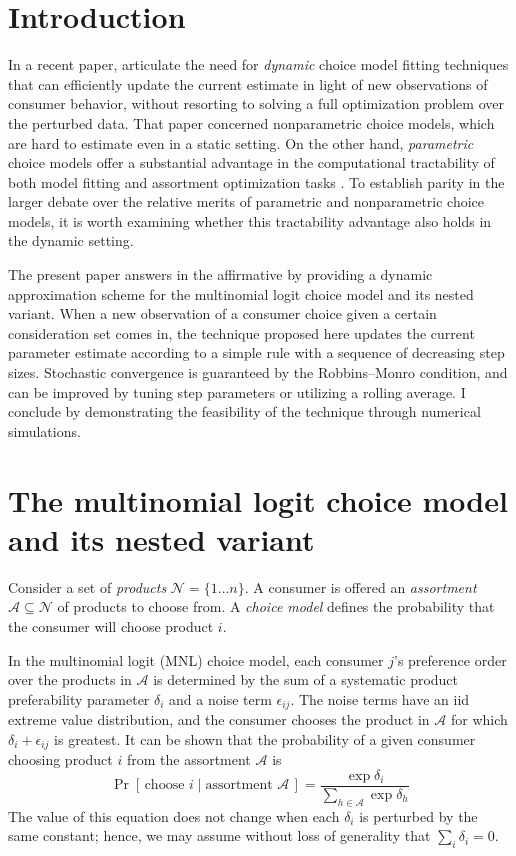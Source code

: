 \documentclass[preprint,12pt,authoryear]{elsarticle}
\begin{document}



\section{Introduction}
In a recent paper, \cite{honguyen2021} articulate the need for \emph{dynamic} choice model fitting techniques that can efficiently update the current estimate in light of new observations of consumer behavior, without resorting to solving a full optimization problem over the perturbed data. That paper concerned nonparametric choice models, which are hard to estimate even in a static setting. On the other hand, \emph{parametric} choice models offer a substantial advantage in the computational tractability of both model fitting and assortment optimization tasks \cite[][]{bunch1987, davis2014}. To establish parity in the larger debate over the relative merits of parametric and nonparametric choice models, it is worth examining whether this tractability advantage also holds in the dynamic setting. 

The present paper answers in the affirmative by providing a dynamic approximation scheme for the multinomial logit choice model and its nested variant. When a new observation of a consumer choice given a certain consideration set comes in, the technique proposed here updates the current parameter estimate according to a simple rule with a sequence of decreasing step sizes. Stochastic convergence is guaranteed by the Robbins--Monro condition, and can be improved by tuning step parameters or utilizing a rolling average. I conclude by demonstrating the feasibility of the technique through numerical simulations. 

\section{The multinomial logit choice model and its nested variant}
Consider a set of \emph{products} $\mathcal{N} = \{1 \dots n\}$. A consumer is offered an \emph{assortment} $\mathcal{A} \subseteq \mathcal{N}$ of products to choose from. A \emph{choice model} defines the probability that the consumer will choose product $i$.

In the multinomial logit (MNL) choice model, each consumer $j$'s preference order over the products in $\mathcal{A}$ is determined by the sum of a systematic product preferability parameter $\delta_i$ and a noise term $\epsilon_{ij}$. The noise terms have an iid extreme value distribution, and the consumer chooses the product in $\mathcal{A}$ for which $\delta_i + \epsilon_{ij}$ is greatest. It can be shown that the probability of a given consumer choosing product $i$ from the assortment $\mathcal{A}$ is
\begin{equation}\label{mnlchoiceprobability}
\operatorname{Pr}\left[\,\text{choose } i \;|\;\text{assortment }\mathcal{A}\,\right] =\frac{\exp \delta_i}{\sum_{h\in \mathcal{A}} \exp \delta_h}
\end{equation}
The value of this equation does not change when each $\delta_i$ is perturbed by the same constant; hence, we may assume without loss of generality that $\sum_i \delta_i = 0$.
\end{document}
